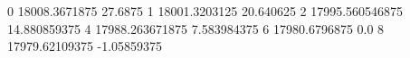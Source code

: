 0 18008.3671875 27.6875
1 18001.3203125 20.640625
2 17995.560546875 14.880859375
4 17988.263671875 7.583984375
6 17980.6796875 0.0
8 17979.62109375 -1.05859375
